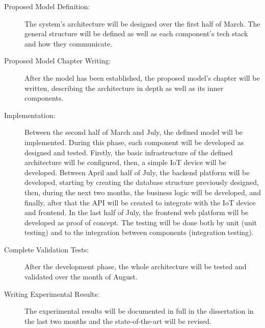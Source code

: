 \begin{description}
	\item[Proposed Model Definition:] The system's architecture will be designed
	      over the first half of March. The general structure will be defined as
	      well as each component's tech stack and how they communicate.
	\item[Proposed Model Chapter Writing:]  After the model has been established,
	      the proposed model's chapter will be written, describing the architecture
	      in depth as well as its inner components.
	\item[Implementation:] Between the second half of March and July, the defined model will be
	      implemented. During this phase, each component will be developed as designed
	      and tested. Firstly, the basic infrastructure of the defined
	      architecture will be configured, then, a simple \gls{IoT} device will
	      be developed. Between April and half of July, the backend platform
	      will be developed, starting by creating the database structure
	      previously designed, then, during the next two months, the business
	      logic will be developed, and finally, after that the \gls{API} will be
	      created to integrate with the \gls{IoT} device and frontend. In the
	      last half of July, the frontend web platform will be developed as
	      proof of concept.
	      The testing will be done both by unit (unit testing) and to the
	      integration between components (integration testing).
	\item[Complete Validation Tests: ]After the development phase, the whole
	      architecture will be tested and validated over the month of August.
	\item[Writing Experimental Results:] The experimental results will be
	      documented in full in the dissertation in the last two months and
	      the state-of-the-art will be revised.
\end{description}

